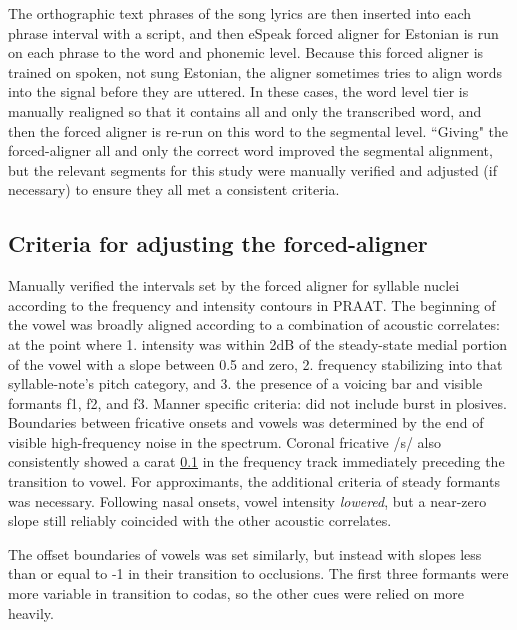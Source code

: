 
The orthographic text phrases of the song lyrics are then inserted into each phrase interval with a script, and then eSpeak forced aligner for Estonian \citep{eSpeak1995} is run on each phrase to the word and phonemic level. Because this forced aligner is trained on spoken, not sung Estonian, the aligner sometimes tries to align words into the signal before they are uttered. In these cases, the word level tier is manually realigned so that it contains all and only the transcribed word, and then the forced aligner is re-run on this word to the segmental level. ``Giving" the forced-aligner all and only the correct word improved the segmental alignment, but the relevant segments for this study were manually verified and adjusted (if necessary) to ensure they all met a consistent criteria. 
\subsection{Criteria for adjusting the forced-aligner}


Manually verified the intervals set by the forced aligner for syllable nuclei according to the frequency and intensity contours in PRAAT. 
The beginning of the vowel was broadly aligned according to a combination of acoustic correlates: at the point where 1. intensity was within 2dB of the steady-state medial portion of the vowel with a slope between 0.5 and zero, 2. frequency stabilizing into that syllable-note's pitch category, and 3. the presence of a voicing bar and visible formants f1, f2, and f3. Manner specific criteria: did not include burst in plosives. Boundaries between fricative onsets and vowels was determined by the end of visible high-frequency noise in the spectrum. Coronal fricative /s/ also consistently showed a carat \ref{} in the frequency track immediately preceding the transition to vowel. For approximants, the additional criteria of steady formants was necessary. Following nasal onsets, vowel intensity {\it lowered}, but a near-zero slope still reliably coincided with the other acoustic correlates. 


 The offset boundaries of vowels was set similarly, but instead with slopes less than or equal to -1 in their transition to occlusions. The first three formants were more variable in transition to codas, so the other cues were relied on more heavily. 

